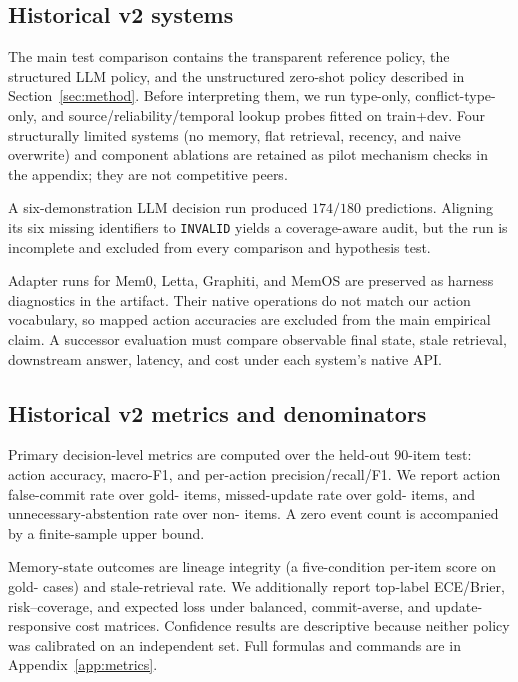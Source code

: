 \subsection{Historical v2 systems}

The main test comparison contains the transparent reference policy, the
structured LLM policy, and the unstructured zero-shot policy described in
Section~\ref{sec:method}. Before interpreting them, we run type-only,
conflict-type-only, and source/reliability/temporal lookup probes fitted on
train+dev. Four structurally limited systems (no memory, flat retrieval,
recency, and naive overwrite) and component ablations are retained as pilot
mechanism checks in the appendix; they are not competitive peers.

A six-demonstration LLM decision run produced $174/180$ predictions. Aligning
its six missing identifiers to \texttt{INVALID} yields a coverage-aware audit,
but the run is incomplete and excluded from every comparison and hypothesis
test.

Adapter runs for Mem0, Letta, Graphiti, and MemOS are preserved as harness
diagnostics in the artifact. Their native operations do not match our action
vocabulary, so mapped action accuracies are excluded from the main empirical
claim. A successor evaluation must compare observable final state, stale
retrieval, downstream answer, latency, and cost under each system's native API.

\subsection{Historical v2 metrics and denominators}

Primary decision-level metrics are computed over the held-out $90$-item test:
action accuracy, macro-F1, and per-action precision/recall/F1. We report
action false-commit rate over gold-\abstain{} items, missed-update rate over
gold-\supersede{} items, and unnecessary-abstention rate over non-\abstain{}
items. A zero event count is accompanied by a finite-sample upper bound.

Memory-state outcomes are lineage integrity (a five-condition per-item score on
gold-\supersede{} cases) and stale-retrieval rate. We additionally report
top-label ECE/Brier, risk--coverage, and expected loss under balanced,
commit-averse, and update-responsive cost matrices. Confidence results are
descriptive because neither policy was calibrated on an independent set. Full
formulas and commands are in Appendix~\ref{app:metrics}.

